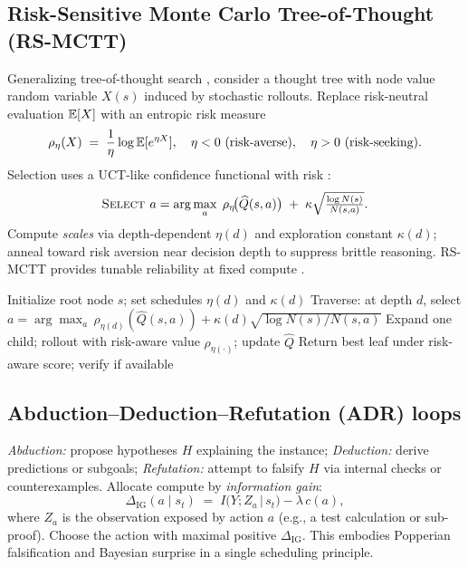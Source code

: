 \subsection{Risk-Sensitive Monte Carlo Tree-of-Thought (RS-MCTT)}

Generalizing tree-of-thought search \cite{yao2023tot}, consider a thought tree with node value random variable $X(s)$ induced by stochastic rollouts. Replace risk-neutral evaluation $\mathbb{E}[X]$ with an entropic risk measure \cite{ahmadi2012entropic,howard1972risk}
\begin{equation}
\rho_{\eta}(X) \;=\; \frac{1}{\eta} \log \mathbb{E}[e^{\eta X}],
\quad \eta < 0 \text{ (risk-averse)},\quad \eta>0 \text{ (risk-seeking)}.
\end{equation}
Selection uses a UCT-like confidence functional with risk \cite{kocsis2006uct}:
\[
\textsc{Select } a = \arg\max_{a} \; \rho_{\eta}\!\big(\widehat{Q}(s,a)\big) \;+\; \kappa \sqrt{\tfrac{\log N(s)}{N(s,a)}}.
\]
Compute \emph{scales} via depth-dependent $\eta(d)$ and exploration constant $\kappa(d)$; anneal toward risk aversion near decision depth to suppress brittle reasoning. RS-MCTT provides tunable reliability at fixed compute \cite{tamar2015pgcrm}.

\begin{algorithm}[h]
\caption{RS-MCTT (risk-annealed UCT for thoughts)}
\label{alg:rsmctt}
\begin{algorithmic}[1]
\STATE Initialize root node $s$; set schedules $\eta(d)$ and $\kappa(d)$
\REPEAT
    \STATE Traverse: at depth $d$, select $a = \arg\max_{a}\, \rho_{\eta(d)}(\widehat{Q}(s,a)) + \kappa(d)\sqrt{\log N(s)/N(s,a)}$
    \STATE Expand one child; rollout with risk-aware value $\rho_{\eta(\cdot)}$; update $\widehat{Q}$
\STATE Return best leaf under risk-aware score; verify if available
\end{algorithmic}
\end{algorithm}

\subsection{Abduction--Deduction--Refutation (ADR) loops}

\emph{Abduction:} propose hypotheses $H$ explaining the instance; 
\emph{Deduction:} derive predictions or subgoals; 
\emph{Refutation:} attempt to falsify $H$ via internal checks or counterexamples.
Allocate compute by \emph{information gain}:
\begin{equation}
\Delta_{\mathrm{IG}}(a \mid s_t) \;=\; I\big(Y; Z_a \,\big|\, s_t \big) - \lambda\, c(a),
\end{equation}
where $Z_a$ is the observation exposed by action $a$ (e.g., a test calculation or sub-proof). Choose the action with maximal positive $\Delta_{\mathrm{IG}}$. This embodies Popperian falsification and Bayesian surprise in a single scheduling principle.

